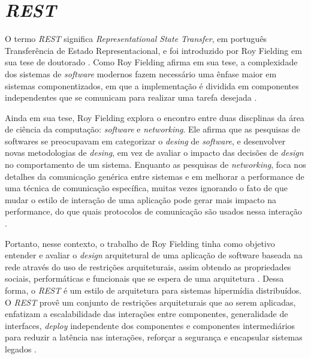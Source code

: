 \section{\textit{REST}}

	O termo \textit{REST} significa \textit{Representational State Transfer}, em português Transferência de Estado Representacional, e foi introduzido por Roy Fielding em sua tese de doutorado \cite{fielding2000architectural}. Como Roy Fielding afirma em sua tese, a complexidade dos sistemas de \textit{software} modernos fazem necessário uma ênfase maior  em sistemas componentizados, em que a implementação é dividida em componentes independentes que se comunicam para realizar uma tarefa desejada \cite{fielding2000architectural}.
	
	Ainda em sua tese, Roy Fielding explora o encontro entre duas discplinas da área de ciência da computação: \textit{software} e \textit{networking}. Ele afirma que as pesquisas de softwares se preocupavam em categorizar o \textit{desing} de \textit{software}, e desenvolver novas metodologias de \textit{desing}, em vez de avaliar o impacto das decisões de \textit{design} no comportamento de um sistema. Enquanto as pesquisas de \textit{networking}, foca nos detalhes da comunicação genérica entre sistemas e em melhorar a performance de uma técnica de comunicação específica, muitas vezes ignorando o fato de que mudar o estilo de interação de uma aplicação pode gerar mais impacto na performance, do que quais protocolos de comunicação são usados nessa interação \cite{fielding2000architectural}.
	
	Portanto, nesse contexto, o trabalho de Roy Fielding \cite{fielding2000architectural} tinha como objetivo entender e avaliar o \textit{design} arquitetural de uma aplicação de software baseada na rede através do uso de restrições arquiteturais, assim obtendo as propriedades sociais, performáticas e funcionais que se espera de uma arquitetura \cite{fielding2000architectural}. Dessa forma, o \textit{REST} é um estilo de arquitetura para sistemas hipermídia distribuídos. O \textit{REST} provê um conjunto de restrições arquiteturais que ao serem aplicadas, enfatizam a escalabilidade das interações entre componentes, generalidade de interfaces, \textit{deploy} independente dos componentes e componentes intermediários para reduzir a latência nas interações, reforçar a segurança e encapsular sistemas legados \cite{fielding2000architectural}.
	
